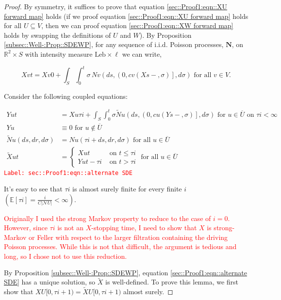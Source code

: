\documentclass[12pt]{article}
\newcommand{\mb}{\mathbb}
\newcommand{\mc}{\mathcal}
\newcommand{\ov}{\overline}
\newcommand{\te}{\text}
\newcommand{\tr}{\textcolor{red}}
\newcommand{\labe}[1]{\tr{\texttt{Label: #1}}}
\newcommand{\ind}{\hspace{24pt}}
\newcommand{\ex}[1]{\mb{E}\left[#1\right]}			%
\renewcommand{\v}{v}							%
\newcommand{\vv}{u}								%
\renewcommand{\U}{U}							%
\newcommand{\UU}{W}								%
\renewcommand{\S}{S}							%
\newcommand{\s}{\sigma}							%
\renewcommand{\t}{t}							%
\renewcommand{\tt}{s}							%
\newcommand{\X}{X}								%
\newcommand{\IGr}{c}							%
\newcommand{\neigh}{\mc{N}}						%
\newcommand{\cl}{\ov}							%
\newcommand{\const}{C}							%
\newcommand{\poisses}{\mathbf{N}}				%
\newcommand{\poiss}{N}							%
\newcommand{\leb}{\te{Leb}}						%
\newcommand{\Sm}{\ell}							%
\renewcommand{\r}{r}							%
\newcommand{\alt}[1]{\widetilde{#1}}			%
\newcommand{\XX}{Y}								%
\newcommand{\rt}{\tau}							%
\begin{document}
\begin{proof}
By symmetry, it suffices to prove that equation \ref{sec::Proof1:eqn::XU forward map} holds (if we proof equation \eqref{sec::Proof1:eqn::XU forward map} holds for all \(\U \subseteq V\), then we can proof equation \eqref{sec::Proof1:eqn::XW forward map} holds by swapping the definitions of \(\U\) and \(\UU\)). By Proposition \ref{subsec::Well-:Prop::SDEWP}, for any sequence of i.i.d. Poisson processes, \(\poisses\), on \(\mb{R}^2\times \S\) with intensity measure \(\leb\times\Sm\) we can write,

\[\X{\v}{\t} = \X{\v}{0} + \int_\S\int_0^\t \s\,\poiss{\v}\left(d\tt,\left(0,\IGr{\v}(\X{}{\tt-},\s)\right],d\s\right)\te{ for all } \v\in V.\]

Consider the following coupled equations:

\begin{align}
\XX{\vv}{\t} &= \X{\vv}{\rt{i}} + \int_\S\int_0^\t \s\alt{\poiss}{\vv}\left(d\tt,\left(0,\IGr{\vv}(\XX{}{\tt-},\s)\right],d\s\right)\te{ for } \vv \in \cl{\U} \te{ on } \rt{i} < \infty \label{sec::Proof1:eqn::alternate SDE}\\
\XX{\vv}{} &\equiv 0\te{ for } \vv\notin \cl{\U}\nonumber\\
\alt{\poiss}{\vv}(d\tt,d\r,d\s) &= \poiss{\vv}(\rt{i} + d\tt,d\r,d\s) \te{ for all }\vv\in \cl{\U}\nonumber\\
\alt{\X}{\vv}{\t} &= \begin{cases}
\X{\vv}{\t} &\te{ on } \t \leq \rt{i}\\
\XX{\vv}{\t - \rt{i}} &\te{ on } \t > \rt{i}
\end{cases} \te{ for all } \vv\in \cl{\U} \nonumber
\end{align}
\labe{sec::Proof1:eqn::alternate SDE}

It's easy to see that \(\rt{i}\) is almost surely finite for every finite \(i\) \(\left(\ex{\rt{i}} = \frac{i}{\const{}|\neigh{\U}|} < \infty\right)\). 

\ind \tr{Originally I used the strong Markov property to reduce to the case of \(i = 0\). However, since \(\rt{i}\) is not an \(\X{}{}\)-stopping time, I need to show that \(\X{}{}\) is strong-Markov or Feller with respect to the larger filtration containing the driving Poisson processes. While this is not that difficult, the argument is tedious and long, so I chose not to use this reduction.}

\ind By Proposition \ref{subsec::Well-:Prop::SDEWP}, equation \eqref{sec::Proof1:eqn::alternate SDE} has a unique solution, so \(\alt{\X}{}{}\) is well-defined. To prove this lemma, we first show that \(\X{\U}{[0,\rt{i+1})} = \alt{\X}{\U}{}{[0,\rt{i+1})}\) almost surely. 


\end{proof}
\end{document}
